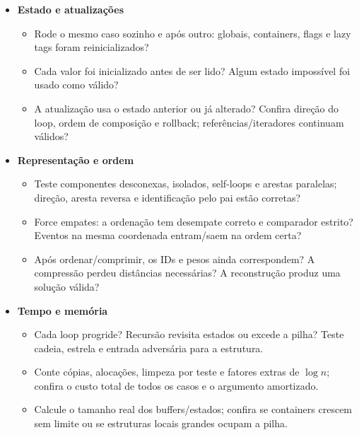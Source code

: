 \begin{itemize}[leftmargin=*,label={}]
\item \ifextended\else\begin{minipage}[t]{\linewidth}\fi\textbf{Estado e atualizações}
\begin{itemize}[leftmargin=*,label={\(\square\)}]
\item Rode o mesmo caso sozinho e após outro: globais, containers, flags e lazy tags foram reinicializados?
\item Cada valor foi inicializado antes de ser lido? Algum estado impossível foi usado como válido?
\item A atualização usa o estado anterior ou já alterado? Confira direção do loop, ordem de composição e rollback; referências/iteradores continuam válidos?
\end{itemize}
\ifextended\else\end{minipage}\fi

\item \ifextended\else\begin{minipage}[t]{\linewidth}\fi\textbf{Representação e ordem}
\begin{itemize}[leftmargin=*,label={\(\square\)}]
\item Teste componentes desconexas, isolados, self-loops e arestas paralelas; direção, aresta reversa e identificação pelo pai estão corretas?
\item Force empates: a ordenação tem desempate correto e comparador estrito? Eventos na mesma coordenada entram/saem na ordem certa?
\item Após ordenar/comprimir, os IDs e pesos ainda correspondem? A compressão perdeu distâncias necessárias? A reconstrução produz uma solução válida?
\end{itemize}
\ifextended\else\end{minipage}\fi

\item \ifextended\else\begin{minipage}[t]{\linewidth}\fi\textbf{Tempo e memória}
\begin{itemize}[leftmargin=*,label={\(\square\)}]
\item Cada loop progride? Recursão revisita estados ou excede a pilha? Teste cadeia, estrela e entrada adversária para a estrutura.
\item Conte cópias, alocações, limpeza por teste e fatores extras de $\log n$; confira o custo total de todos os casos e o argumento amortizado.
\item Calcule o tamanho real dos buffers/estados; confira se containers crescem sem limite ou se estruturas locais grandes ocupam a pilha.
\end{itemize}
\ifextended\else\end{minipage}\fi


\end{itemize}
